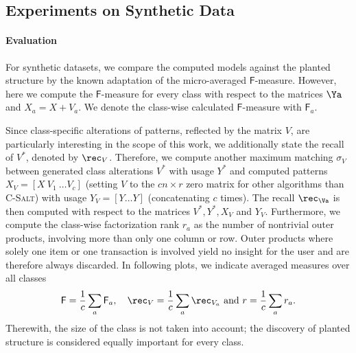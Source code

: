 \subsection{Experiments on Synthetic Data}\label{sec:CS:synthExp}
\paragraph{Evaluation}
For synthetic datasets, we compare the computed models against the planted structure by the known adaptation of the micro-averaged $\mathsf{F}$-measure. However, here we compute the $\mathsf{F}$-measure for every class with respect to the matrices $\Ya$ and $X_a=X+V_a$. We denote the class-wise calculated $\mathsf{F}$-measure with $\mathsf{F}_a$.

Since class-specific alterations of patterns, reflected by the matrix $V$, are particularly interesting in the scope of this work, we additionally state the recall of $V^*$, denoted by $\rec_V$. Therefore, we compute another maximum matching $\sigma_V$ between generated class alterations $V^*$ with usage $Y^*$ and computed patterns $X_V=[X\ V_1\ \ldots V_c]$ (setting $V$ to the $cn\times r$ zero matrix for other algorithms than \textsc{C-Salt}) with usage $Y_V=[Y \ldots Y]$ (concatenating $c$ times). The recall $\rec_\Va$ is then computed with respect to the matrices $V^*, Y^*, X_V$ and $Y_V$.
Furthermore, we compute the class-wise factorization rank $r_a$ as the number of nontrivial outer products, involving more than only one column or row. Outer products where solely one item or one transaction is involved yield no insight for the user and are therefore always discarded. In following plots, we indicate averaged measures over all classes
\[ \mathsf{F}=\frac{1}{c}\sum_a \mathsf{F}_a, \quad \rec_V=\frac{1}{c}\sum_a \rec_{V_a} \text{ and } r=\frac{1}{c}\sum_a r_a.
\]
Therewith, the size of the class is not taken into account; the discovery of planted structure is considered equally important for every class.
